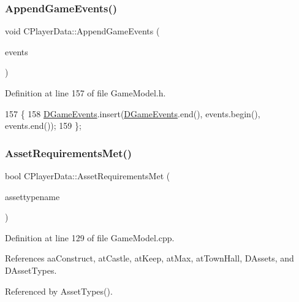 \subsubsection{\texorpdfstring{Append\+Game\+Events()}{AppendGameEvents()}}
{\footnotesize\ttfamily void C\+Player\+Data\+::\+Append\+Game\+Events (\begin{DoxyParamCaption}\item[{const std\+::vector$<$ \hyperlink{structSGameEvent}{S\+Game\+Event} $>$ \&}]{events }\end{DoxyParamCaption})\hspace{0.3cm}{\ttfamily [inline]}}



Definition at line 157 of file Game\+Model.\+h.


\begin{DoxyCode}
157                                                                     \{
158             \hyperlink{classCPlayerData_a9a7af43e88055d6d1a384a8817a655a0}{DGameEvents}.insert(\hyperlink{classCPlayerData_a9a7af43e88055d6d1a384a8817a655a0}{DGameEvents}.end(), events.begin(), events.end());
159         \};
\end{DoxyCode}
\hypertarget{classCPlayerData_a21238056db09447e0ed054aafbd953c1}{}\label{classCPlayerData_a21238056db09447e0ed054aafbd953c1} 
\subsubsection{\texorpdfstring{Asset\+Requirements\+Met()}{AssetRequirementsMet()}}
{\footnotesize\ttfamily bool C\+Player\+Data\+::\+Asset\+Requirements\+Met (\begin{DoxyParamCaption}\item[{const std\+::string \&}]{assettypename }\end{DoxyParamCaption})}



Definition at line 129 of file Game\+Model.\+cpp.



References aa\+Construct, at\+Castle, at\+Keep, at\+Max, at\+Town\+Hall, D\+Assets, and D\+Asset\+Types.



Referenced by Asset\+Types().


